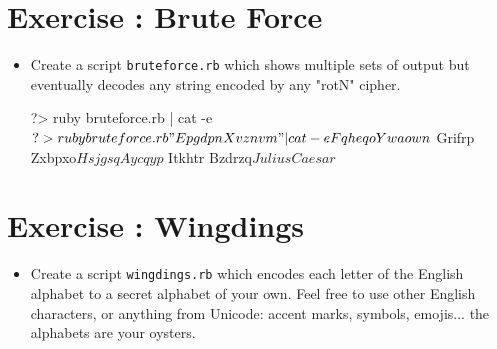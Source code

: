 \documentclass{42-en}
\begin{document}

\chapter{Exercise \exercicenumber: Brute Force}

\exnumber{\exercicenumber}


\begin{itemize}

\item Create a script \texttt{bruteforce.rb} which shows multiple sets of output but eventually decodes any string encoded by any "rotN" cipher.

\begin{42console}
	?> ruby bruteforce.rb | cat -e
	$
	?> ruby bruteforce.rb "Epgdpn Xvznvm" | cat -e
	Fqheqo Ywaown$
	Grifrp Zxbpxo$
	Hsjgsq Aycqyp$
	Itkhtr Bzdrzq$
	Julius Caesar$
\end{42console}

\end{itemize}


\chapter{Exercise \exercicenumber: Wingdings}

\exnumber{\exercicenumber}


\begin{itemize}

\item Create a script \texttt{wingdings.rb} which encodes each letter of the English alphabet to a secret alphabet of your own. Feel free to use other English characters, or anything from Unicode: accent marks, symbols, emojis... the alphabets are your oysters.

\end{itemize}
\end{document}
